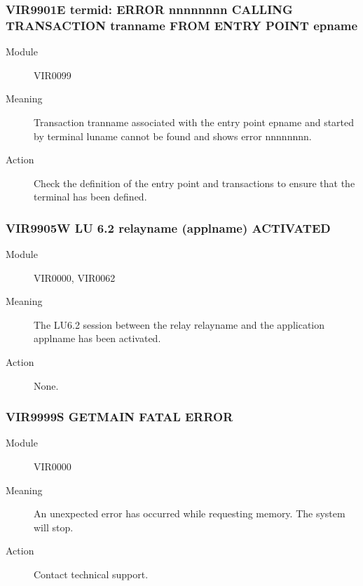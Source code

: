 \documentclass[letterpaper,10pt,english]{sphinxmanual}
\begin{document}
\subsubsection{VIR9901E termid: ERROR nnnnnnnn CALLING TRANSACTION tranname FROM ENTRY POINT epname}
\label{\detokenize{messages:vir9901e-termid-error-nnnnnnnn-calling-transaction-tranname-from-entry-point-epname}}\begin{description}
\item[{Module}] \leavevmode
VIR0099

\item[{Meaning}] \leavevmode
Transaction tranname associated with the entry point epname and started by terminal luname cannot be found and shows error nnnnnnnn.

\item[{Action}] \leavevmode
Check the definition of the entry point and transactions to ensure that the terminal has been defined.

\end{description}


\subsubsection{VIR9905W LU 6.2 relayname (applname) ACTIVATED}
\label{\detokenize{messages:vir9905w-lu-6-2-relayname-applname-activated}}\begin{description}
\item[{Module}] \leavevmode
VIR0000, VIR0062

\item[{Meaning}] \leavevmode
The LU6.2 session between the relay relayname and the application applname has been activated.

\item[{Action}] \leavevmode
None.

\end{description}


\subsubsection{VIR9999S GETMAIN FATAL ERROR}
\label{\detokenize{messages:vir9999s-getmain-fatal-error}}\begin{description}
\item[{Module}] \leavevmode
VIR0000

\item[{Meaning}] \leavevmode
An unexpected error has occurred while requesting memory. The system will stop.

\item[{Action}] \leavevmode
Contact technical support.

\end{description}
\end{document}
